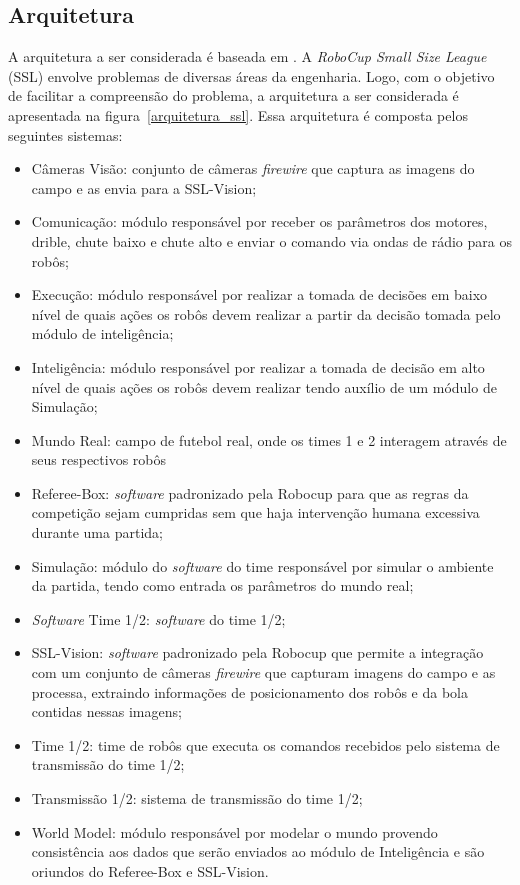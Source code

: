 \subsection{Arquitetura}

A arquitetura a ser considerada é baseada em \cite{felixnavarro}.
A \textit{RoboCup Small Size League} (SSL) envolve problemas de diversas áreas
da engenharia. Logo, com o objetivo de facilitar a compreensão do
problema, a arquitetura a ser considerada é apresentada na
figura~\ref{arquitetura_ssl}. Essa arquitetura é composta pelos seguintes
sistemas:

\begin{itemize}
  \item Câmeras Visão: conjunto de câmeras \textit{firewire} que captura as imagens do
        campo e as envia para a SSL-Vision;
  \item Comunicação: módulo responsável por receber os parâmetros
        dos motores, drible, chute baixo e chute alto e enviar o comando via
        ondas de rádio para os robôs;
  \item Execução: módulo responsável por realizar a tomada de decisões
        em baixo nível de quais ações os robôs devem realizar a partir
        da decisão tomada pelo módulo de inteligência;
  \item Inteligência: módulo responsável por realizar a tomada de
        decisão em alto nível de quais ações os robôs devem realizar
        tendo auxílio de um módulo de Simulação;
  \item Mundo Real: campo de futebol real, onde os times 1 e 2 interagem
        através de seus respectivos robôs
  \item Referee-Box: \textit{software} padronizado pela Robocup para que as
        regras da competição sejam cumpridas sem que haja intervenção
        humana excessiva durante uma partida;
  \item Simulação: módulo do \textit{software} do time responsável por simular
        o ambiente da partida, tendo como entrada os parâmetros do mundo
        real;
  \item \textit{Software} Time 1/2: \textit{software} do time 1/2;
  \item SSL-Vision: \textit{software} padronizado pela Robocup que permite a
        integração com um conjunto de câmeras \textit{firewire} que capturam
        imagens do campo e as processa, extraindo informações de posicionamento
        dos robôs e da bola contidas nessas imagens;
  \item Time 1/2: time de robôs que executa os comandos recebidos pelo
        sistema de transmissão do time 1/2;
  \item Transmissão 1/2: sistema de transmissão do time 1/2;
  \item World Model: módulo responsável por modelar o mundo
        provendo consistência aos dados que serão enviados ao módulo de
        Inteligência e são oriundos do Referee-Box e SSL-Vision.
\end{itemize}

